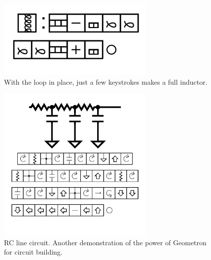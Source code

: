 \begin{figure}
	\centering
	\includegraphics[width=3in]{figures/shapes/inductor.png}
	\caption[inductor]
	{With the loop in place, just a few keystrokes makes a full inductor.}
\end{figure}


\begin{figure}
	\centering
	\includegraphics[width=3in]{figures/shapes/rcline.png}
	\caption[RCline]
	{RC line circuit. Another demonstration of the power of Geometron for circuit building.}
\end{figure}

